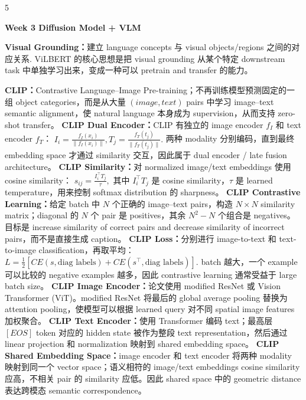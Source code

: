 \documentclass[a4paper, landscape]{article}
\newcommand{\topic}[1]{\par\medskip\textbf{#1}\par}
\renewcommand{\topic}[1]{%
  \par\smallskip\noindent
  \colorbox{highlightcolor}{%
    \parbox{\dimexpr\columnwidth-2\fboxsep\relax}{%
      \textbf{#1}%
    }%
  }%
  \par
}
\begin{document}
\begin{multicols}{5}

\topic{Week 3 Diffusion Model + VLM}

\par \textbf{Visual Grounding：}建立 language concepts 与 visual objects/regions 之间的对应关系. ViLBERT 的核心思想是把 visual grounding 从某个特定 downstream task 中单独学习出来，变成一种可以 pretrain and transfer 的能力。

\par \textbf{CLIP：}Contrastive Language--Image Pre-training；不再训练模型预测固定的一组 object categories，而是从大量 \((image,text)\) pairs 中学习 image--text semantic alignment，使 natural language 本身成为 supervision，从而支持 zero-shot transfer。
\textbf{CLIP Dual Encoder：}CLIP 有独立的 image encoder \(f_I\) 和 text encoder \(f_T\)：
\(
I_i=\frac{f_I(x_i)}{\|f_I(x_i)\|},
T_j=\frac{f_T(t_j)}{\|f_T(t_j)\|}.
\)
两种 modality 分别编码，直到最终 embedding space 才通过 similarity 交互，因此属于 dual encoder / late fusion architecture。
\textbf{CLIP Similarity：}对 normalized image/text embeddings 使用 cosine similarity：
\(
s_{ij}=\frac{I_i^\top T_j}{\tau},
\)
其中 \(I_i^\top T_j\) 是 cosine similarity，\(\tau\) 是 learned temperature，用来控制 softmax distribution 的 sharpness。
\textbf{CLIP Contrastive Learning：}给定 batch 中 \(N\) 个正确的 image--text pairs，构造 \(N\times N\) similarity matrix；diagonal 的 \(N\) 个 pair 是 positives，其余 \(N^2-N\) 个组合是 negatives。目标是 increase similarity of correct pairs and decrease similarity of incorrect pairs，而不是直接生成 caption。
\textbf{CLIP Loss：}分别进行 image-to-text 和 text-to-image classification，再取平均：
\(
L=\frac12\left[
CE(s,\text{diag labels})
+
CE(s^\top,\text{diag labels})
\right].
\)
batch 越大，一个 example 可以比较的 negative examples 越多，因此 contrastive learning 通常受益于 large batch size。
\textbf{CLIP Image Encoder：}论文使用 modified ResNet 或 Vision Transformer (ViT)。modified ResNet 将最后的 global average pooling 替换为 attention pooling，使模型可以根据 learned query 对不同 spatial image features 加权聚合。
\textbf{CLIP Text Encoder：}使用 Transformer 编码 text；最高层 \([EOS]\) token 对应的 hidden state 被作为整段 text representation，然后通过 linear projection 和 normalization 映射到 shared embedding space。
\textbf{CLIP Shared Embedding Space：}image encoder 和 text encoder 将两种 modality 映射到同一个 vector space；语义相符的 image/text embeddings cosine similarity 应高，不相关 pair 的 similarity 应低。因此 shared space 中的 geometric distance 表达跨模态 semantic correspondence。


\end{multicols}
\end{document}
